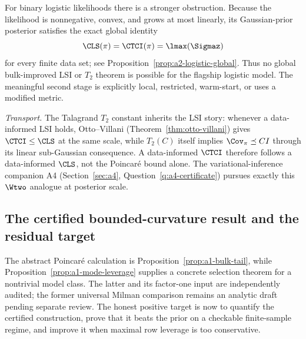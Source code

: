 \documentclass[../../main.tex]{subfiles}
\begin{document}
For binary logistic likelihoods there is a stronger obstruction. Because the likelihood is
nonnegative, convex, and grows at most linearly, its Gaussian-prior posterior satisfies the exact
global identity
\begin{equation}\label{eq:a1-logistic-rigidity}
  \CLS(\pi)=\CTCI(\pi)=\lmax(\Sigmaz)
\end{equation}
for every finite data set; see Proposition~\ref{prop:a2-logistic-global}. Thus no global
bulk-improved LSI or $T_2$ theorem is possible for the flagship logistic model. The meaningful
second stage is explicitly local, restricted, warm-start, or uses a modified metric.

\emph{Transport.} The Talagrand $T_2$ constant inherits the LSI story: whenever a data-informed
LSI holds, Otto--Villani (Theorem~\ref{thm:otto-villani}) gives $\CTCI\le\CLS$ at the same scale,
while $T_2(C)$ itself implies $\Cov_\pi\preceq C I$ through its linear sub-Gaussian consequence.
A data-informed $\CTCI$ therefore follows a data-informed $\CLS$, not the
Poincar\'e bound alone. The variational-inference companion A4 (Section~\ref{sec:a4},
Question~\ref{q:a4-certificate}) pursues exactly this $\Wtwo$ analogue at posterior scale.

\subsection{The certified bounded-curvature result and the residual target}
\label{subsec:a1-theorem}

The abstract Poincar\'e calculation is Proposition~\ref{prop:a1-bulk-tail}, while
Proposition~\ref{prop:a1-mode-leverage} supplies a concrete selection theorem for a nontrivial
model class. The latter and its factor-one input are independently audited; the former universal
Milman comparison remains an analytic draft pending separate review. The honest positive target
is now to quantify the certified construction, prove that it beats the prior on a checkable
finite-sample regime, and improve it when maximal row leverage is too conservative.
\end{document}
